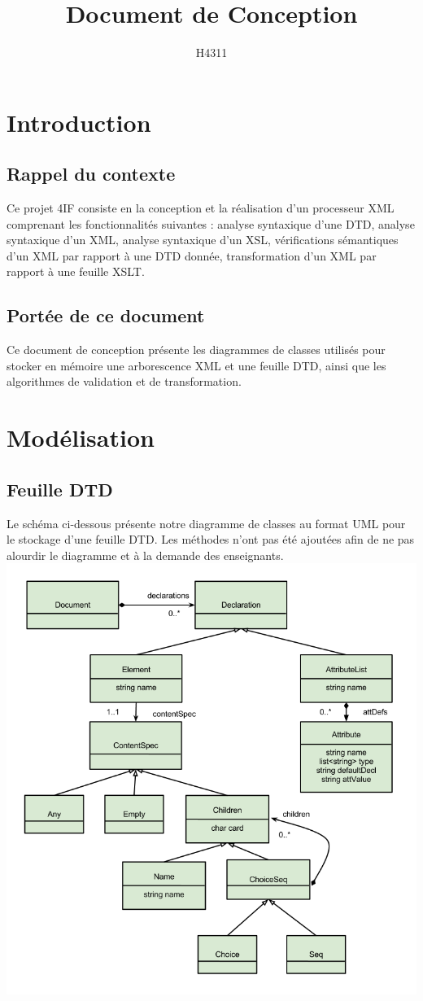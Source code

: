 \documentclass[10pt,a4paper]{article}
\author{H4311}
\title{Document de Conception}
\begin{document}
\maketitle
\tableofcontents

\section{Introduction}
\subsection{Rappel du contexte}
Ce projet 4IF consiste en la conception et la réalisation d'un processeur XML comprenant les fonctionnalités suivantes : analyse syntaxique d'une DTD, analyse syntaxique d'un XML, analyse syntaxique d'un XSL, vérifications sémantiques d'un XML par rapport à une DTD donnée, transformation d'un XML par rapport à une feuille XSLT.

\subsection{Portée de ce document}
Ce document de conception présente les diagrammes de classes utilisés pour stocker en mémoire une arborescence XML et une feuille DTD, ainsi que les algorithmes de validation et de transformation.

\section{Modélisation}
\subsection{Feuille DTD}
Le schéma ci-dessous présente notre diagramme de classes au format UML pour le stockage d'une feuille DTD. Les méthodes n'ont pas été ajoutées afin de ne pas alourdir le diagramme et à la demande des enseignants.
\includegraphics[scale=0.65]{DiagrammedeclasseDTD.png} 
\end{document}
